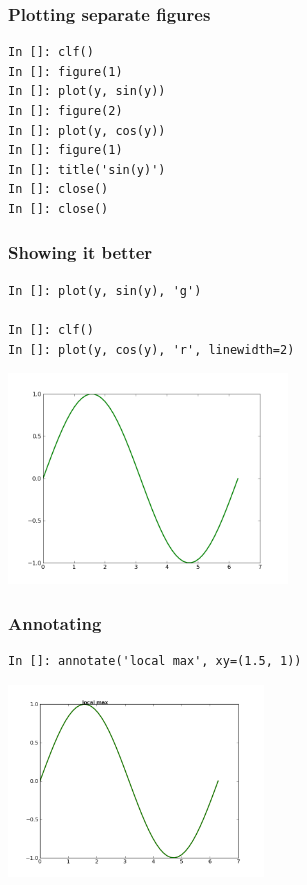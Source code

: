 \documentclass[14pt,compress]{beamer}
\newcounter{time}
\newcommand{\inctime}[1]{\addtocounter{time}{#1}{\tiny \thetime\ m}}
\begin{document}
\begin{frame}[fragile]
\frametitle{Plotting separate figures}
\begin{lstlisting}
In []: clf()
In []: figure(1)
In []: plot(y, sin(y))
In []: figure(2)
In []: plot(y, cos(y))
In []: figure(1)
In []: title('sin(y)')
In []: close()
In []: close()
\end{lstlisting}
\end{frame}

\begin{frame}[fragile]
\frametitle{Showing it better}
\vspace{-0.15in}
\begin{lstlisting}
In []: plot(y, sin(y), 'g')

In []: clf()
In []: plot(y, cos(y), 'r', linewidth=2)
\end{lstlisting}
\vspace*{-0.2in}
\begin{center}
  \includegraphics[height=2.2in, interpolate=true]{data/green}  
\end{center}
\end{frame}

\begin{frame}[fragile]
\frametitle{Annotating}
\vspace*{-0.15in}
\begin{lstlisting}
In []: annotate('local max', xy=(1.5, 1))
\end{lstlisting}
\vspace*{-0.2in}
\begin{center}
  \includegraphics[height=2in, interpolate=true]{data/annotate}  
\end{center}
\end{frame}
\end{document}
